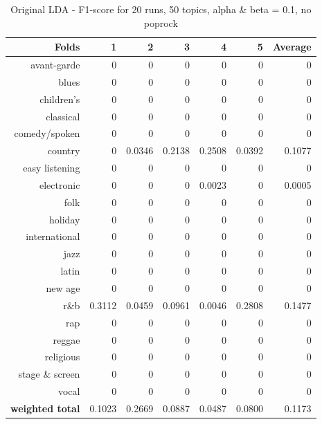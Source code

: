 \begin{table}[h]\label{table:original_nopoprock}
\begin{center}
\begin{tabular}{| r | r | r | r | r | r | r |}
\hline
\textbf{Folds} &  \textbf{1} & \textbf{2} & \textbf{3} & \textbf{4} & \textbf{5} & \textbf{Average}\\
\hline
avant-garde 	& 0 	& 0	 	& 0 	& 0 	& 0 	& 0\\
blues 			& 0 	& 0 	& 0 	& 0 	& 0 	& 0\\
children's 		& 0 	& 0 	& 0 	& 0 	& 0 	& 0\\
classical 		& 0 	& 0  	& 0 	& 0 	& 0 	& 0\\
comedy/spoken 	& 0 	& 0 	& 0 	& 0 	& 0	 	& 0 \\
country			& 0 	& 0.0346 & 0.2138 & 0.2508 	& 0.0392 & 0.1077 \\
easy listening 	& 0 	& 0 	& 0 	& 0 	& 0 	& 0 \\
electronic 		& 0 	& 0 	& 0 	& 0.0023 & 0 	& 0.0005\\
folk 			& 0 	& 0 	& 0 	& 0 	& 0 	& 0\\
holiday 		& 0 	& 0 	& 0 	& 0 	& 0 	& 0 \\
international 	& 0 	& 0 	& 0 	& 0 	& 0 	& 0\\
jazz 			& 0 	& 0 	& 0 	& 0 	& 0 	& 0 \\
latin 			& 0 	& 0 	& 0 	& 0 	& 0 	& 0\\
new age 		& 0 	& 0 	& 0 	& 0 	& 0 	& 0\\
r\&b 			& 0.3112 & 0.0459 & 0.0961 & 0.0046 & 0.2808 & 0.1477\\
rap 			& 0 	& 0 	& 0 	& 0 	& 0 	& 0\\
reggae 			& 0 	& 0 	& 0 	& 0 	& 0 	& 0\\
religious 		& 0 	& 0 	& 0 	& 0 	& 0 	& 0\\
stage \& screen & 0 	& 0 	& 0 	& 0 	& 0 	& 0\\
vocal 			& 0 	& 0 	& 0 	& 0 	& 0 	& 0\\
\hline
\textbf{weighted total} &  0.1023 & 0.2669 & 0.0887 & 0.0487 & 0.0800 & 0.1173\\
\hline
\end{tabular}
\end{center}
\caption{Original LDA - F1-score for 20 runs, 50 topics, alpha \& beta = 0.1, no poprock}
\label{origldatable}
\end{table}